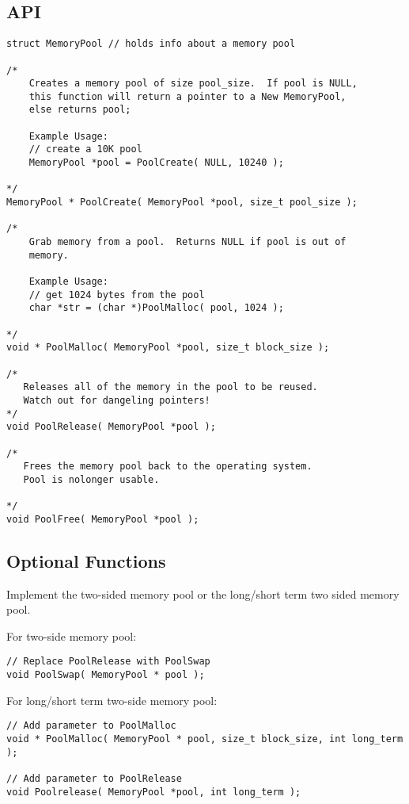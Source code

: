 \documentclass[a4paper,12pt]{report}
\begin{document}
\subsection*{API}
\begin{lstlisting}
struct MemoryPool // holds info about a memory pool

/*
    Creates a memory pool of size pool_size.  If pool is NULL,
    this function will return a pointer to a New MemoryPool, 
    else returns pool;

    Example Usage:
    // create a 10K pool
    MemoryPool *pool = PoolCreate( NULL, 10240 ); 

*/
MemoryPool * PoolCreate( MemoryPool *pool, size_t pool_size );

/*
    Grab memory from a pool.  Returns NULL if pool is out of 
    memory.

    Example Usage:
    // get 1024 bytes from the pool
    char *str = (char *)PoolMalloc( pool, 1024 ); 

*/
void * PoolMalloc( MemoryPool *pool, size_t block_size );

/*
   Releases all of the memory in the pool to be reused.
   Watch out for dangeling pointers!
*/
void PoolRelease( MemoryPool *pool );

/*
   Frees the memory pool back to the operating system.
   Pool is nolonger usable.

*/
void PoolFree( MemoryPool *pool );
\end{lstlisting}

\subsection*{Optional Functions}
Implement the two-sided memory pool or the long/short term two sided memory pool.

For two-side memory pool:
\begin{lstlisting}
// Replace PoolRelease with PoolSwap
void PoolSwap( MemoryPool * pool );
\end{lstlisting}

For long/short term two-side memory pool:
\begin{lstlisting}
// Add parameter to PoolMalloc
void * PoolMalloc( MemoryPool * pool, size_t block_size, int long_term );

// Add parameter to PoolRelease
void Poolrelease( MemoryPool *pool, int long_term );
\end{lstlisting}
\end{document}
